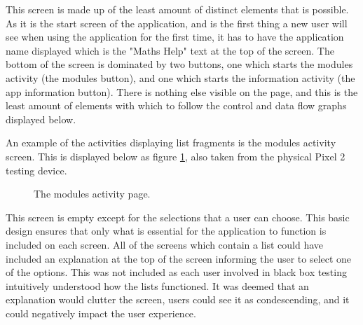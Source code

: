 \documentclass{article}
\begin{document}
This screen is made up of the least amount of distinct elements that is possible. As it is the start screen of the application, and is the first thing a new user will see when using the application for the first time, it has to have the application name displayed which is the "Maths Help" text at the top of the screen. The bottom of the screen is dominated by two buttons, one which starts the modules activity (the modules button), and one which starts the information activity (the app information button). There is nothing else visible on the page, and this is the least amount of elements with which to follow the control and data flow graphs displayed below. \par

An example of the activities displaying list fragments is the modules activity screen. This is displayed below as figure \ref{figure:applicationModulesPage}, also taken from the physical Pixel 2 testing device. 

\begin{figure}[H]
	\centering
	\caption{The modules activity page.}
	\label{figure:applicationModulesPage}
\end{figure}

This screen is empty except for the selections that a user can choose. This basic design ensures that only what is essential for the application to function is included on each screen. All of the screens which contain a list could have included an explanation at the top of the screen informing the user to select one of the options. This was not included as each user involved in black box testing intuitively understood how the lists functioned. It was deemed that an explanation would clutter the screen, users could see it as condescending, and it could negatively impact the user experience. \par
\end{document}
